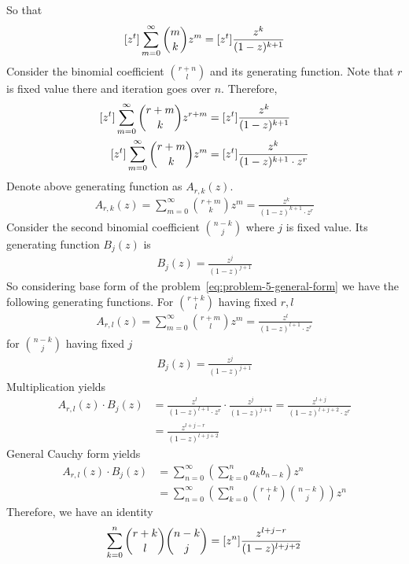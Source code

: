 So that
\begin{align*}
    [z^{t}] \sum_{m=0}^{\infty} \binom{m}{k} z^m = [z^{t}] \frac{z^k}{(1-z)^{k+1}}
\end{align*}
Consider the binomial coefficient $\binom{r+n}{l}$ and its generating function.
Note that $r$ is fixed value there and iteration goes over $n$.
Therefore,
\begin{align*}
    \coefficientOf{z}{t} \sum_{m=0}^{\infty} \binom{r+m}{k} z^{r+m} &= \coefficientOf{z}{t} \frac{z^k}{(1-z)^{k+1}} \\
    \coefficientOf{z}{t} \sum_{m=0}^{\infty} \binom{r+m}{k} z^{m}   &= \coefficientOf{z}{t} \frac{z^k}{(1-z)^{k+1} \cdot z^r}
\end{align*}
Denote above generating function as $A_{r,k}(z)$.
\begin{align*}
    A_{r,k}(z) = \sum_{m=0}^{\infty} \binom{r+m}{k} z^{m} = \frac{z^k}{(1-z)^{k+1} \cdot z^r}
\end{align*}
Consider the second binomial coefficient $\binom{n-k}{j}$ where $j$ is fixed value.
Its generating function $B_j(z)$ is
\begin{align*}
    B_j(z) = \frac{z^j}{(1-z)^{j+1}}
\end{align*}
So considering base form of the problem~\eqref{eq:problem-5-general-form} we have the following generating functions.
For $\binom{r+k}{l}$ having fixed $r, l$
\begin{align*}
    A_{r,l}(z) = \sum_{m=0}^{\infty} \binom{r+m}{l} z^{m} = \frac{z^l}{(1-z)^{l+1} \cdot z^r}
\end{align*}
for $\binom{n-k}{j}$ having fixed $j$
\begin{align*}
    B_j(z) = \frac{z^j}{(1-z)^{j+1}}
\end{align*}
Multiplication yields
\begin{align*}
    A_{r,l}(z) \cdot B_j(z) &= \frac{z^l}{(1-z)^{l+1} \cdot z^r} \cdot \frac{z^j}{(1-z)^{j+1}}
    = \frac{z^{l+j}}{(1-z)^{l+j+2} \cdot z^r} \\
    &= \frac{z^{l+j-r}}{(1-z)^{l+j+2}}
\end{align*}
General Cauchy form yields
\begin{align*}
    A_{r,l}(z) \cdot B_j(z) &= \sum_{n=0}^{\infty} \left( \sum_{k=0}^{n} a_k b_{n-k} \right) z^n \\
    &= \sum_{n=0}^{\infty} \left( \sum_{k=0}^{n} \binom{r+k}{l} \binom{n-k}{j} \right) z^n
\end{align*}
Therefore, we have an identity
\begin{align*}
    \sum_{k=0}^{n} \binom{r+k}{l} \binom{n-k}{j} = [z^{n}] \frac{z^{l+j-r}}{(1-z)^{l+j+2}}
\end{align*}

